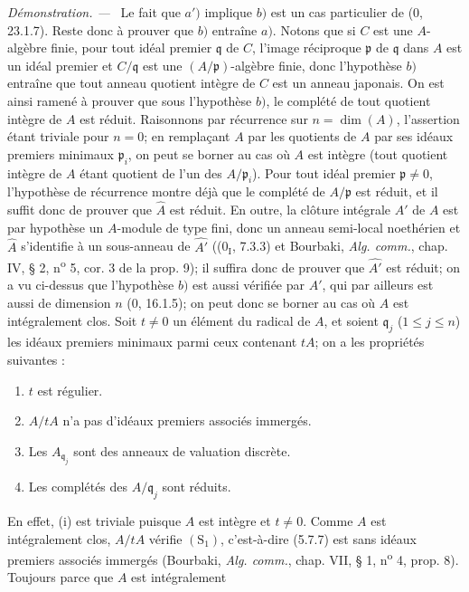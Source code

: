 \documentclass[10pt,oneside]{book}
\newenvironment{proof}{%
  \par\medskip\noindent\textit{Démonstration. ---\ }}{\par}
\begin{document}
\begin{proof}
Le fait que $a')$ implique $b)$ est un cas particulier de (0, 23.1.7). Reste
donc à prouver que $b)$ entraîne $a)$. Notons que si $C$ est une $A$-algèbre
finie, pour tout idéal premier $\mathfrak q$ de $C$, l'image réciproque
$\mathfrak p$ de $\mathfrak q$ dans $A$ est un idéal premier et
$C/\mathfrak q$ est une $(A/\mathfrak p)$-algèbre finie, donc l'hypothèse $b)$
entraîne que tout anneau quotient intègre de $C$ est un anneau japonais. On est
ainsi ramené à prouver que sous l'hypothèse $b)$, le complété de tout quotient
intègre de $A$ est réduit. Raisonnons par récurrence sur $n=\dim(A)$,
l'assertion étant triviale pour $n=0$; en remplaçant $A$ par les quotients de
$A$ par ses idéaux premiers minimaux $\mathfrak p_i$, on peut se borner au cas
où $A$ est intègre (tout quotient intègre de $A$ étant quotient de l'un des
$A/\mathfrak p_i$). Pour tout idéal premier $\mathfrak p\neq0$, l'hypothèse de
récurrence montre déjà que le complété de $A/\mathfrak p$ est réduit, et il
suffit donc de prouver que $\widehat A$ est réduit. En outre, la clôture
intégrale $A'$ de $A$ est par hypothèse un $A$-module de type fini, donc un
anneau semi-local noethérien et $\widehat A$ s'identifie à un sous-anneau de
$\widehat{A'}$ ((0$_{\mathrm I}$, 7.3.3) et Bourbaki, \emph{Alg. comm.}, chap.
IV, § 2, n\textsuperscript{o} 5, cor. 3 de la prop. 9); il suffira donc de
prouver que $\widehat{A'}$ est réduit; on a vu ci-dessus que l'hypothèse $b)$
est aussi vérifiée par $A'$, qui par ailleurs est aussi de dimension $n$
(0, 16.1.5); on peut donc se borner au cas où $A$ est intégralement clos. Soit
$t\neq0$ un élément du radical de $A$, et soient $\mathfrak q_j$
($1\leq j\leq n$) les idéaux premiers minimaux parmi ceux contenant $tA$; on a
les propriétés suivantes :
\begin{enumerate}
\item[\emph{(i)}] $t$ est régulier.
\item[\emph{(ii)}] $A/tA$ n'a pas d'idéaux premiers associés immergés.
\item[\emph{(iii)}] Les $A_{\mathfrak q_j}$ sont des anneaux de valuation
discrète.
\item[\emph{(iv)}] Les complétés des $A/\mathfrak q_j$ sont réduits.
\end{enumerate}
En effet, (i) est triviale puisque $A$ est intègre et $t\neq0$. Comme $A$ est
intégralement clos, $A/tA$ vérifie $(\mathrm S_1)$, c'est-à-dire (5.7.7) est
sans idéaux premiers associés immergés (Bourbaki, \emph{Alg. comm.}, chap. VII,
§ 1, n\textsuperscript{o} 4, prop. 8). Toujours parce que $A$ est
intégralement


\end{proof}
\end{document}

